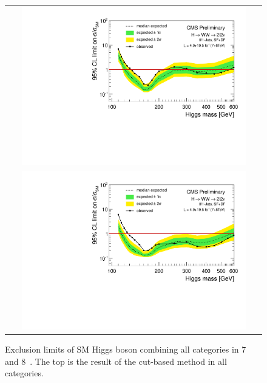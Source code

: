 \begin{figure}[htp] 
\centering 
\begin{tabular}{c} 
\includegraphics[width=0.9\textwidth]{figures/table_limits_nj_cut_78TeV_log.pdf} \\
\includegraphics[width=0.9\textwidth]{figures/table_limits_nj_78TeV_log.pdf} 
\end{tabular} 
\caption{Exclusion limits of SM Higgs boson combining all categories in 7 and 8~\TeV. 
The top is the result of the cut-based method in all categories. }
\label{fig:limit78} 
\end{figure} 

